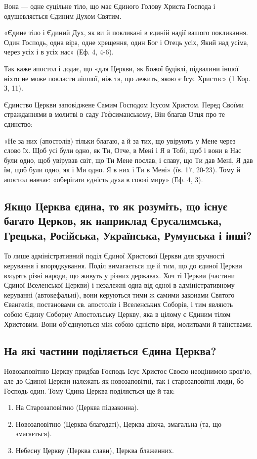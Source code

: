 \documentclass[main.tex]{subfiles}
\begin{document}
Вона — одне суцільне тіло, що має Єдиного Голову Христа Господа і одушевляється Єдиним Духом Святим.
 
«Єдине тіло і Єдиний Дух, як ви й покликані в єдиній надії вашого покликання. Один Господь, одна віра, одне хрещення, один Бог і Отець усіх, Який над усіма, через усіх і в усіх нас» (Еф. 4, 4-6).

Так каже апостол і додає, що «для Церкви, як Божої будівлі, підвалини іншої ніхто не може покласти ліпшої, ніж та, що лежить, якою є Ісус Христос» (1 Кор. З, 11).

Єдинство Церкви заповіджене Самим Господом Ісусом Христом. Перед Своїми стражданнями в молитві в саду Гефсиманському, Він благав Отця про те єдинство:

«Не за них (апостолів) тільки благаю, а й за тих, що увірують у Мене через слово їх. Щоб усі були одно, як Ти, Отче, в Мені і Я в Тобі, щоб і вони в Нас були одно, щоб увірував світ, що Ти Мене послав, і славу, що Ти дав Мені, Я дав їм, щоб були одно, як і Ми одно. Я в них і Ти в Мені» (їв. 17, 20-23). Тому й апостол навчає: «оберігати єдність духа в союзі миру» (Еф. 4, 3).

\subsection{Якщо Церква єдина, то як розуміть, що існує багато Церков, як наприклад Єрусалимська, Грецька, Російська, Українська, Румунська і інші?}

То лише адміністративний поділ Єдиної Христової Церкви для зручності керування і впорядкування. Поділ вимагається ще й тим, що до єдиної Церкви входять різні народи, що живуть у різних державах. Хоч ті Церкви (частини Єдиної Вселенської Церкви) і незалежні одна від одної в адміністративному керуванні (автокефальні), вони керуються тими ж самими законами Святого Євангелія, постановами св. апостолів і Вселенських Соборів, і тим являють собою Єдину Соборну Апостольську Церкву, яка в цілому є Єдиним тілом Христовим. Вони об`єднуються між собою єдністю віри, молитвами й таїнствами.

\subsection{На які частини поділяється Єдина Церква?}

Новозаповітню Церкву придбав Господь Ісус Христос Своєю неоцінимою кров`ю, але до Єдиної Церкви належать як новозаповітні, так і старозаповітні люди, бо Господь один. Тому Єдина Церква поділяється ще й так:
\begin{enumerate}
    \item На Старозаповітню (Церква підзаконна).
    \item Новозаповітню (Церква благодаті), Церква діюча,
    змагальна (та, що змагається).
    \item Небесну Церкву (Церква слави), Церква блаженних.
\end{enumerate}
\end{document}
